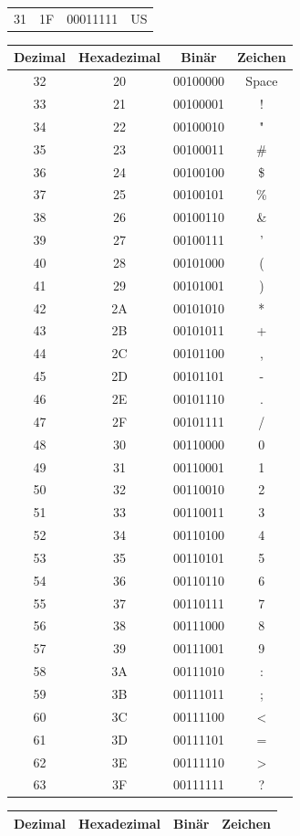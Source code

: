 \begin{table}[H]
\begin{tabular}{cccc}
        31 & 1F & 00011111 & US \\
        \end{tabular}
    \begin{tabular}{cccc}
            \toprule
            Dezimal & Hexadezimal & Binär & Zeichen \\
            \midrule
        32 & 20 & 00100000 & Space \\
        33 & 21 & 00100001 & ! \\
        34 & 22 & 00100010 & " \\
        35 & 23 & 00100011 & \# \\
        36 & 24 & 00100100 & \$ \\
        37 & 25 & 00100101 & \% \\
        38 & 26 & 00100110 & \& \\
        39 & 27 & 00100111 & ' \\
        40 & 28 & 00101000 & ( \\
        41 & 29 & 00101001 & ) \\
        42 & 2A & 00101010 & * \\
        43 & 2B & 00101011 & + \\
        44 & 2C & 00101100 & , \\
        45 & 2D & 00101101 & - \\
        46 & 2E & 00101110 & . \\
        47 & 2F & 00101111 & / \\
        48 & 30 & 00110000 & 0 \\
        49 & 31 & 00110001 & 1 \\
        50 & 32 & 00110010 & 2 \\
        51 & 33 & 00110011 & 3 \\
        52 & 34 & 00110100 & 4 \\
        53 & 35 & 00110101 & 5 \\
        54 & 36 & 00110110 & 6 \\
        55 & 37 & 00110111 & 7 \\
        56 & 38 & 00111000 & 8 \\
        57 & 39 & 00111001 & 9 \\
        58 & 3A & 00111010 & : \\
        59 & 3B & 00111011 & ; \\
        60 & 3C & 00111100 & < \\
        61 & 3D & 00111101 & = \\
        62 & 3E & 00111110 & > \\
        63 & 3F & 00111111 & ? \\
        \end{tabular}
    \begin{tabular}{cccc}
            \toprule
            Dezimal & Hexadezimal & Binär & Zeichen \\
            \midrule
        

\end{tabular}
\end{table}
